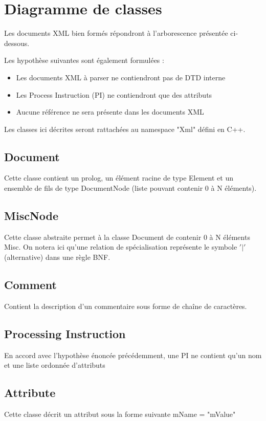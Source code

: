 \chapter{Diagramme de classes}
Les documents XML bien formés répondront à l'arborescence présentée ci-dessous.

Les hypothèse suivantes sont également formulées :
\begin{itemize}
    \item Les documents XML à parser ne contiendront pas de DTD interne
    \item Les Process Instruction (PI) ne contiendront que des attributs
    \item Aucune référence ne sera présente dans les documents XML\\
\end{itemize}

Les classes ici décrites seront rattachées au namespace "Xml" défini en C++.

\section{Document}
Cette classe contient un prolog, un élément racine de type Element et un ensemble de fils de type DocumentNode (liste pouvant contenir 0 à N éléments).

\section{MiscNode}
Cette classe abstraite permet à la classe Document de contenir 0 à N éléments Misc.
    On notera ici qu'une relation de spécialisation représente le symbole $'|'$ (alternative) dans une règle BNF.

\section{Comment}
Contient la description d'un commentaire sous forme de chaîne de caractères.

\section{Processing Instruction}
En accord avec l'hypothèse énoncée précédemment, une PI ne contient qu'un nom et une liste ordonnée d'attributs

\section{Attribute}
Cette classe décrit un attribut sous la forme suivante
mName = "mValue"

